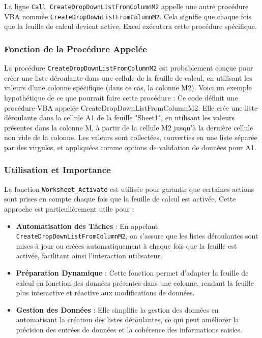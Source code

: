 \documentclass[a4paper, oneside, 12pt, final]{extreport}
\begin{document}
La ligne \texttt{Call CreateDropDownListFromColumnM2} appelle une autre procédure VBA nommée \texttt{CreateDropDownListFromColumnM2}. Cela signifie que chaque fois que la feuille de calcul devient active, Excel exécutera cette procédure spécifique.

\subsubsection{Fonction de la Procédure Appelée}

La procédure \texttt{CreateDropDownListFromColumnM2} est probablement conçue pour créer une liste déroulante dans une cellule de la feuille de calcul, en utilisant les valeurs d'une colonne spécifique (dans ce cas, la colonne M2). Voici un exemple hypothétique de ce que pourrait faire cette procédure :
Ce code définit une procédure VBA appelée CreateDropDownListFromColumnM2. Elle crée une liste déroulante dans la cellule A1 de la feuille "Sheet1", en utilisant les valeurs présentes dans la colonne M, à partir de la cellule M2 jusqu'à la dernière cellule non vide de la colonne. Les valeurs sont collectées, converties en une liste séparée par des virgules, et appliquées comme options de validation de données pour A1.

\subsubsection{Utilisation et Importance}

La fonction \texttt{Worksheet\_Activate} est utilisée pour garantir que certaines actions sont prises en compte chaque fois que la feuille de calcul est activée. Cette approche est particulièrement utile pour :

\begin{itemize}
    \item \textbf{Automatisation des Tâches} : En appelant \texttt{CreateDropDownListFromColumnM2}, on s'assure que les listes déroulantes sont mises à jour ou créées automatiquement à chaque fois que la feuille est activée, facilitant ainsi l'interaction utilisateur.
    \item \textbf{Préparation Dynamique} : Cette fonction permet d'adapter la feuille de calcul en fonction des données présentes dans une colonne, rendant la feuille plus interactive et réactive aux modifications de données.
    \item \textbf{Gestion des Données} : Elle simplifie la gestion des données en automatisant la création des listes déroulantes, ce qui peut améliorer la précision des entrées de données et la cohérence des informations saisies.
\end{itemize}
\end{document}

